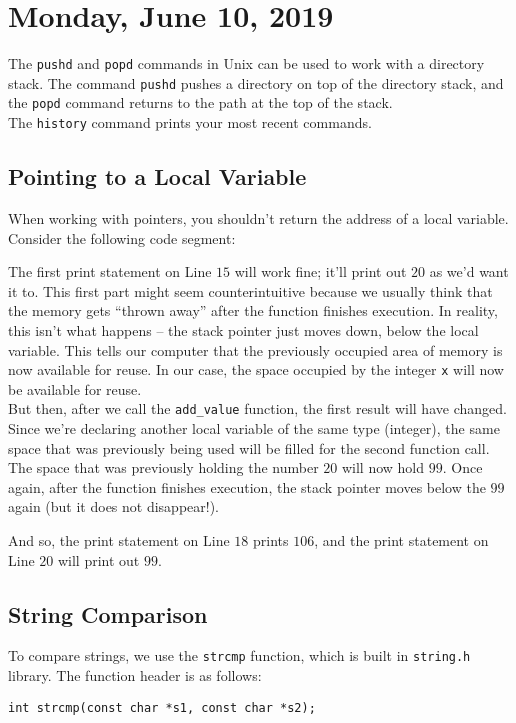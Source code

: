 \section{Monday, June 10, 2019}
The \verb!pushd! and \verb!popd! commands in Unix can be used to work with a directory stack. The command \verb!pushd! pushes a directory on top of the directory stack, and the \verb!popd! command returns to the path at the top of the stack. \\

The \verb!history! command prints your most recent commands.


\subsection{Pointing to a Local Variable}
When working with pointers, you shouldn't return the address of a local variable. Consider the following code segment:

\lstset{
caption=Incorrect Pointer Usage
}
\begin{center}
\label{Pointer to a Local Variable}
\end{center}

The first print statement on Line $15$ will work fine; it'll print out $20$ as we'd want it to. This first part might seem counterintuitive because we usually think that the memory gets ``thrown away'' after the function finishes execution. In reality, this isn't what happens -- the stack pointer just moves down, below the local variable. This tells our computer that the previously occupied area of memory is now available for reuse. In our case, the space occupied by the integer \verb!x! will now be available for reuse. \\

But then, after we call the \verb!add_value! function, the first result will have changed. Since we're declaring another local variable of the same type (integer), the same space that was previously being used will be filled for the second function call. The space that was previously holding the number $20$ will now hold $99$. Once again, after the function finishes execution, the stack pointer moves below the $99$ again (but it does not disappear!). 


And so, the print statement on Line $18$ prints $106$, and the print statement on Line $20$ will print out $99$. 


\subsection{String Comparison}
To compare strings, we use the \verb!strcmp! function, which is built in \texttt{string.h} library. The function header is as follows:
\begin{center}
    \texttt{int strcmp(const char *s1, const char *s2);}
\end{center}

